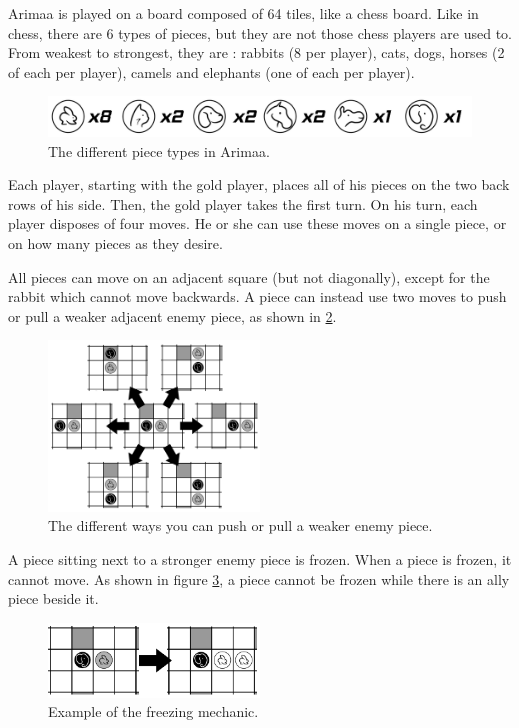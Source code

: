 Arimaa is played on a board composed of 64 tiles, like a chess board. Like in chess, there are 6 types of pieces, but they are not those chess players are used to. From weakest to strongest, they are : rabbits (8 per player), cats, dogs, horses (2 of each per player), camels and elephants (one of each per player).

\begin{figure}[!h]
\centering
\includegraphics[width=\textwidth]{Pictures/Pieces.png}
\caption{\label{fig:pieces}The different piece types in Arimaa.}
\end{figure}

Each player, starting with the gold player, places all of his pieces on the two back rows of his side. Then, the gold player takes the first turn.
On his turn, each player disposes of four moves. He or she can use these moves on a single piece, or on how many pieces as they desire.

All pieces can move on an adjacent square (but not diagonally), except for the rabbit which cannot move backwards.
A piece can instead use two moves to push or pull a weaker adjacent enemy piece, as shown in \ref{fig:displace}.

\begin{figure}[!h]
\centering
\includegraphics[width=0.5\textwidth]{Pictures/Displace.png}
\caption{\label{fig:displace}The different ways you can push or pull a weaker enemy piece.}
\end{figure}

A piece sitting next to a stronger enemy piece is frozen. When a piece is frozen, it cannot move. As shown in figure \ref{fig:freeze}, a piece cannot be frozen while there is an ally piece beside it.

\begin{figure}[!h]
\centering
\includegraphics[width=0.5\textwidth]{Pictures/Freeze.png}
\caption{\label{fig:freeze}Example of the freezing mechanic.}
\end{figure}

